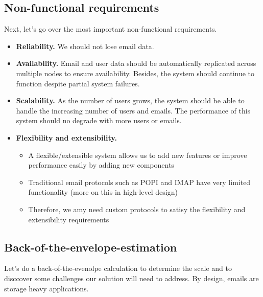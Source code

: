 \documentclass{report}
\theoremstyle{definition}
\let\oldsubsection\subsection
\renewcommand{\subsection}{\oldsubsection*}
\begin{document}
\subsection{Non-functional requirements}

Next, let's go over the most important non-functional requirements.

\begin{itemize}
\item
\textbf{Reliability.} We should not lose email data.

\item
\textbf{Availability.} Email  and user data should be automatically replicated across multiple nodes to ensure availability. Besides, the system should continue to function despite partial system failures.

\item
\textbf{Scalability.} As the number of users grows, the system should be able to handle the increasing number of users and emails. The performance of this system should no degrade with more users or emails.

\item
\textbf{Flexibility and extensibility.}

\begin{itemize}
\item
A flexible/extensible system allows us to add new features or improve performance easily by adding new components
\item
Traditional email protocols such as POPI and IMAP have very limited functionality (more on this in high-level design)
\item
Therefore, we amy need custom protocols to satisy the flexibility and extensibility requirements
\end{itemize}
\end{itemize}

\subsection{Back-of-the-envelope-estimation}

Let's do a back-of-the-evenolpe calculation to determine the scale and to disccover some challenges our solution will need to address. By design, emails are storage heavy applications.
\end{document}
